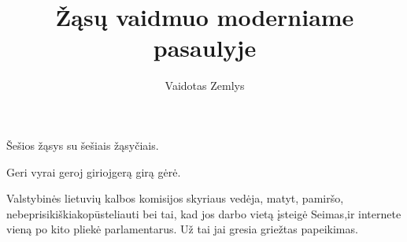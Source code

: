 \documentclass{article}
\begin{document}
\author{Vaidotas Zemlys}
\title{Žąsų vaidmuo moderniame pasaulyje}
\maketitle
\thispagestyle{empty}

Šešios žąsys su šešiais žąsyčiais.

Geri vyrai geroj girioj\newline gerą girą gėrė.

Valstybinės lietuvių kalbos komisijos skyriaus vedėja, matyt, pamiršo, nebeprisikiškiakopūsteliauti bei tai, kad jos darbo vietą įsteigė Seimas,\newpage ir internete vieną po kito pliekė parlamentarus. Už tai jai gresia griežtas papeikimas.
\end{document}
